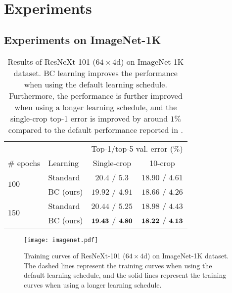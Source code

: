 \documentclass[10pt,twocolumn,letterpaper]{article}
\begin{document}
\section{Experiments}\label{4}
\subsection{Experiments on ImageNet-1K}
\begin{table}
	\centering
	\caption{Results of ResNeXt-101 ($64\times4$d) \cite{xie2017aggregated} on ImageNet-1K dataset. BC learning improves the performance when using the default learning schedule. Furthermore, the performance is further improved when using a longer learning schedule, and the single-crop  top-1 error is improved by around $1\%$ compared to the default performance reported in \cite{xie2017aggregated}.}
	\label{tab:imagenet}
	\vspace{2mm}
	\small
	\begin{tabular}{llcc}
		\toprule
		&& \multicolumn{2}{c}{Top-1/top-5 val. error ($\%$)} \\
		\cmidrule{3-4}
		\# epochs & Learning & Single-crop & 10-crop \\
		\midrule
		\multirow{2}{*}{$100$} & Standard & $20.4$ / $5.3$ \cite{xie2017aggregated} & $18.90$ / $4.61$ \\	
						& BC (ours) & $19.92$ / $4.91$ & $18.66$ / $4.26$ \\
		\midrule
		\multirow{2}{*}{$150$} & Standard & $20.44$ / $5.25$ & $18.98$ / $4.43$\\
						& BC (ours) & ${\bf 19.43}$ / ${\bf 4.80}$ & ${\bf 18.22}$ / ${\bf 4.13} $\\
		\bottomrule
	\end{tabular}
\end{table} 

\begin{figure}
	\centering
	\vspace{-4mm}
	\texttt{[image: imagenet.pdf]}	
		\caption{Training curves of ResNeXt-101 ($64\times4$d) on ImageNet-1K dataset. The dashed lines represent the training curves when using the default learning schedule, and the solid lines represent the training curves when using a longer learning schedule.}
		\label{fig:imagenet}
	\vspace{-2mm}
\end{figure}
\end{document}
